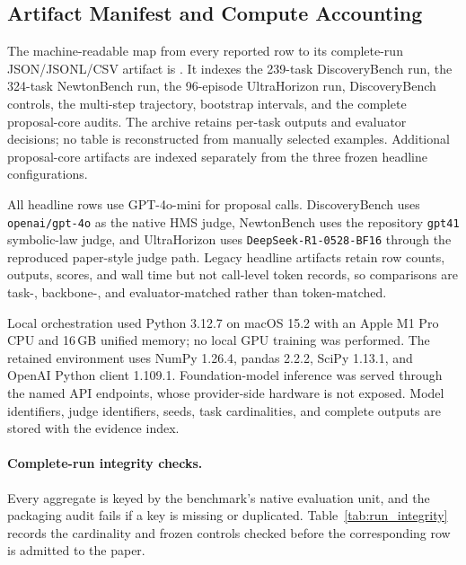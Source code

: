 \documentclass[letterpaper]{article}
\newcommand{\gptmini}{GPT-4o-mini\xspace}
\begin{document}
\subsection*{Artifact Manifest and Compute Accounting}

The machine-readable map from every reported row to its complete-run
JSON/JSONL/CSV artifact is
.  It
indexes the 239-task DiscoveryBench run, the 324-task NewtonBench run, the
96-episode UltraHorizon run, DiscoveryBench controls, the multi-step
trajectory, bootstrap intervals, and the complete proposal-core audits.  The
archive retains per-task outputs and evaluator decisions; no table is
reconstructed from manually selected examples. Additional proposal-core
artifacts are indexed separately from the three frozen headline configurations.

All headline rows use \gptmini for proposal calls. DiscoveryBench uses
\texttt{openai/gpt-4o} as the native HMS judge, NewtonBench uses the repository
\texttt{gpt41} symbolic-law judge, and UltraHorizon uses
\texttt{DeepSeek-R1-0528-BF16} through the reproduced paper-style judge path.
Legacy headline artifacts retain row counts, outputs, scores, and wall time
but not call-level token records, so comparisons are task-, backbone-, and
evaluator-matched rather than token-matched.

Local orchestration used Python 3.12.7 on macOS 15.2 with an Apple M1 Pro CPU
and 16\,GB unified memory; no local GPU training was performed. The retained
environment uses NumPy 1.26.4, pandas 2.2.2, SciPy 1.13.1, and OpenAI Python
client 1.109.1. Foundation-model inference was served through the named API
endpoints, whose provider-side hardware is not exposed. Model identifiers,
judge identifiers, seeds, task cardinalities, and complete outputs are stored
with the evidence index.

\paragraph{Complete-run integrity checks.}
Every aggregate is keyed by the benchmark's native evaluation unit, and the
packaging audit fails if a key is missing or duplicated.
Table~\ref{tab:run_integrity} records the cardinality and frozen controls
checked before the corresponding row is admitted to the paper.
\end{document}
